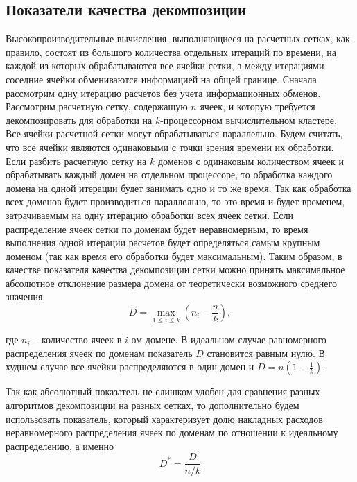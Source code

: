 \subsection{Показатели качества декомпозиции}

Высокопроизводительные вычисления, выполняющиеся на расчетных сетках, как правило, состоят из большого количества отдельных итераций по времени, на каждой из которых обрабатываются все ячейки сетки, а между итерациями соседние ячейки обмениваются информацией на общей границе.
Сначала рассмотрим одну итерацию расчетов без учета информационных обменов.
Рассмотрим расчетную сетку, содержащую $n$ ячеек, и которую требуется декомпозировать для обработки на $k$-процессорном вычислительном кластере.
Все ячейки расчетной сетки могут обрабатываться параллельно.
Будем считать, что все ячейки являются одинаковыми с точки зрения времени их обработки.
Если разбить расчетную сетку на $k$ доменов с одинаковым количеством ячеек и обрабатывать каждый домен на отдельном процессоре, то обработка каждого домена на одной итерации будет занимать одно и то же время.
Так как обработка всех доменов будет производиться параллельно, то это время и будет временем, затрачиваемым на одну итерацию обработки всех ячеек сетки.
Если распределение ячеек сетки по доменам будет неравномерным, то время выполнения одной итерации расчетов будет определяться самым крупным доменом (так как время его обработки будет максимальным).
Таким образом, в качестве показателя качества декомпозиции сетки можно принять максимальное абсолютное отклонение размера домена от теоретически возможного среднего значения
\begin{equation}
	D = \max_{1 \le i \le k}{ \left( n_i - \frac{n}{k} \right) },
\end{equation}
 
где $n_i$ – количество ячеек в $i$-ом домене.
В идеальном случае равномерного распределения ячеек по доменам показатель $D$ становится равным нулю.
В худшем случае все ячейки распределяются в один домен и $D = n \left( 1 - \frac{1}{k} \right)$.

Так как абсолютный показатель не слишком удобен для сравнения разных алгоритмов декомпозиции на разных сетках, то дополнительно будем использовать показатель, который характеризует долю накладных расходов неравномерного распределения ячеек по доменам по отношении к идеальному распределению, а именно
\begin{equation}
	D^{*} = \frac{D}{n / k}
\end{equation}

